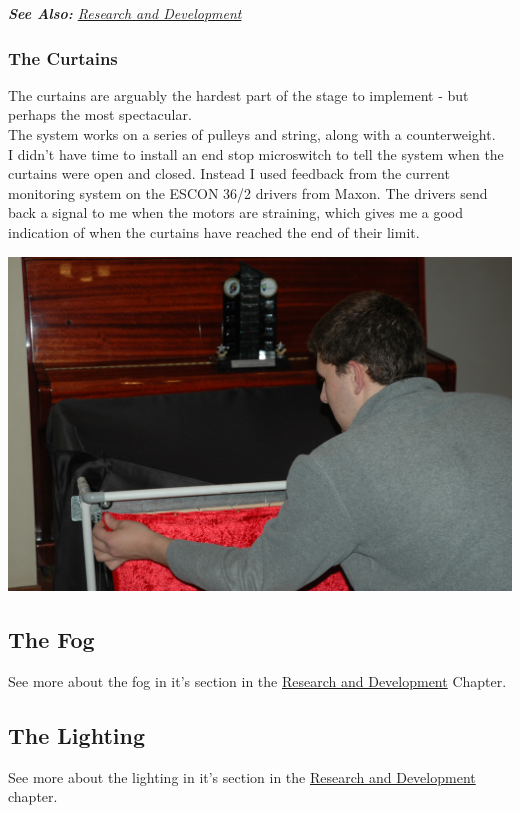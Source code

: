             \textit{\textbf{See Also: }\hyperref[RandD]{Research and Development}}
    		
    		\subsubsection{The Curtains}
    			The curtains are arguably the hardest part of the stage to implement - but perhaps the most spectacular.\\
    			
    			The system works on a series of pulleys and string, along with a counterweight.\\
    			
    			I didn't have time to install an end stop microswitch to tell the system when the curtains were open and closed. Instead I used feedback from the current monitoring system on the ESCON 36/2 drivers from Maxon. The drivers send back a signal to me when the motors are straining, which gives me a good indication of when the curtains have reached the end of their limit.\\				
    			
    			\centerline{\includegraphics[width=0.75\linewidth]{images/CurtainDevelopment}}
    			
    		\subsection{The Fog}
    			See more about the fog in it's section in the \hyperref[RandD]{Research and Development} Chapter.
    			
    		\subsection{The Lighting}
    			See more about the lighting in it's section in the \hyperref[RandD]{Research and Development} chapter.
    			
